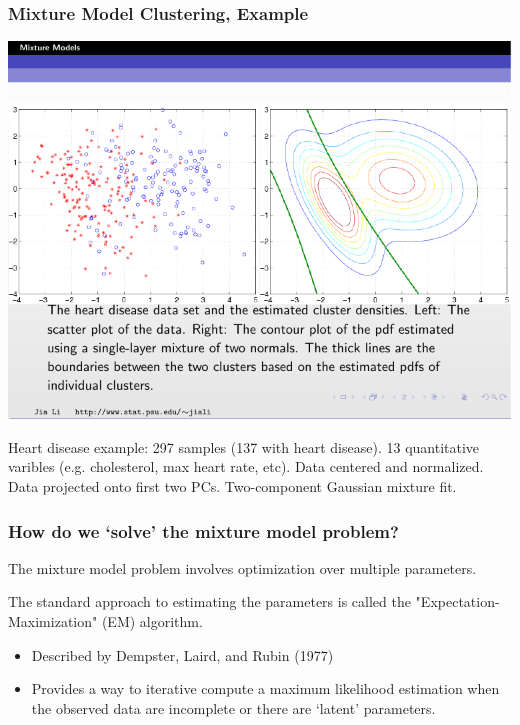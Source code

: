 \documentclass{beamer}
\begin{document}
\begin{frame}
\frametitle{Mixture Model Clustering, Example}
\begin{center}
\includegraphics[width=\textwidth]{heart-disease.pdf}
\end{center}

Heart disease example: 297 samples (137 with heart disease). 13 quantitative varibles (e.g. cholesterol, max heart rate, etc). Data centered and normalized. Data projected onto first two PCs. Two-component Gaussian mixture fit.

\end{frame}


\begin{frame}
  \frametitle{How do we `solve' the mixture model problem?}

The mixture model problem involves optimization over multiple parameters.

The standard approach to estimating the parameters is called the "Expectation-Maximization" (EM) algorithm.

\begin{itemize}
    \item Described by Dempster, Laird, and Rubin (1977)
    \item Provides a way to iterative compute a maximum likelihood estimation when the observed data are incomplete or there are `latent' parameters.
\end{itemize}


\end{frame}
\end{document}
